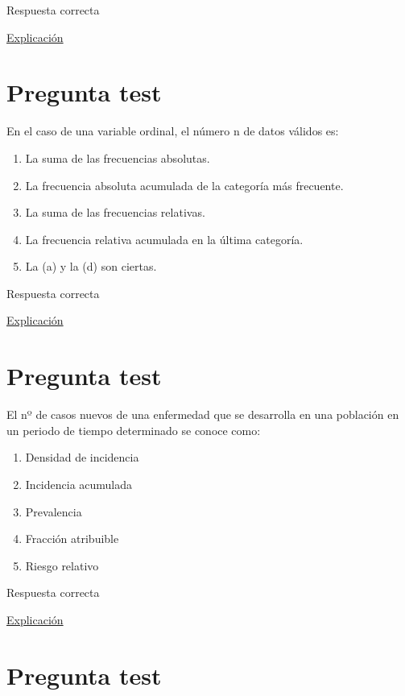 \documentclass[
]{book}
\providecommand{\tightlist}{%
  \setlength{\itemsep}{0pt}\setlength{\parskip}{0pt}}
\begin{document}
Respuesta correcta

\href{https://medlineplus.gov/spanish/ency/article/002387.htm}{Explicación}

\hypertarget{pregunta-test-7}{%
\section{Pregunta test}\label{pregunta-test-7}}

En el caso de una variable ordinal, el número n de datos válidos es:

\begin{enumerate}
\def\labelenumi{\alph{enumi})}
\tightlist
\item
  La suma de las frecuencias absolutas.
\item
  La frecuencia absoluta acumulada de la categoría más frecuente.
\item
  La suma de las frecuencias relativas.
\item
  La frecuencia relativa acumulada en la última categoría.
\item
  La (a) y la (d) son ciertas.
\end{enumerate}

Respuesta correcta

\href{https://1fjmanzano.github.io/bioestadistica/tablas-de-frecuencias.html}{Explicación}

\hypertarget{pregunta-test-8}{%
\section{Pregunta test}\label{pregunta-test-8}}

El nº de casos nuevos de una enfermedad que se desarrolla en una población en un periodo de tiempo determinado se conoce como:

\begin{enumerate}
\def\labelenumi{\alph{enumi})}
\tightlist
\item
  Densidad de incidencia
\item
  Incidencia acumulada
\item
  Prevalencia
\item
  Fracción atribuible
\item
  Riesgo relativo
\end{enumerate}

Respuesta correcta

\href{https://www.conprueba.es/glosario/incidencia-acumulada}{Explicación}

\hypertarget{pregunta-test-9}{%
\section{Pregunta test}\label{pregunta-test-9}}
\end{document}
